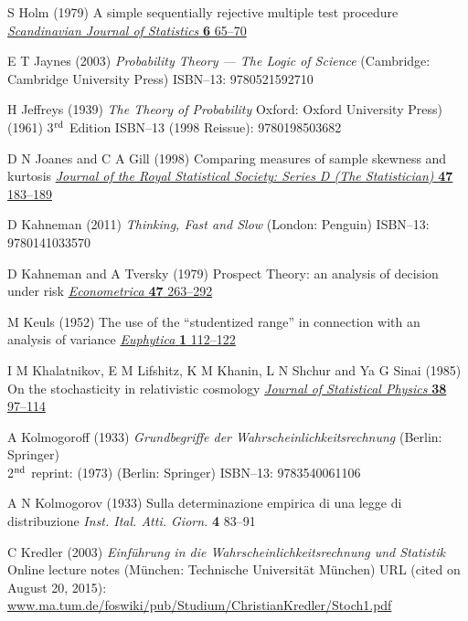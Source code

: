 \begin{thebibliography}{99}
S Holm
(1979) A simple sequentially rejective multiple test procedure
\href{http://www.jstor.org/stable/4615733}{\textit{Scandinavian 
Journal of Statistics} \textbf{6} 65--70}

E T Jaynes
(2003) \textit{Probability Theory --- The Logic of Science}
(Cambridge: Cambridge University Press) 
ISBN--13: 9780521592710

H Jeffreys
(1939) \textit{The Theory of Probability} 
Oxford: Oxford University Press)\\
(1961) 3$^{\rm rd}$ Edition
ISBN--13 (1998 Reissue): 9780198503682

D N Joanes and C A Gill
(1998) Comparing measures of sample skewness and kurtosis 
\href{http://dx.doi.org/10.1111/1467-9884.00122}{\textit{Journal of 
the Royal Statistical Society: Series D (The Statistician)} \textbf{
47} 183--189}

D Kahneman
(2011) \textit{Thinking, Fast and Slow} (London: Penguin)
ISBN--13: 9780141033570

D Kahneman and A Tversky
(1979) Prospect Theory: an analysis of decision under risk
\href{http://www.jstor.org/stable/1914185}{\textit{Econometrica} 
\textbf{47} 263--292}

M Keuls
(1952) The use of the ``studentized range'' in connection with an 
analysis of variance
\href{http://dx.doi.org/10.1007/BF01908269}{\textit{Euphytica}
\textbf{1} 112--122}

I M Khalatnikov, E M Lifshitz, K M Khanin, L N Shchur and Ya G 
Sinai (1985) On the stochasticity in relativistic cosmology
\href{http://dx.doi.org/10.1007/BF01017851}{\textit{Journal of 
Statistical Physics} \textbf{38} 97--114}

A Kolmogoroff
(1933) \textit{Grundbegriffe der Wahrscheinlichkeitsrechnung}
(Berlin: Springer)\\
2$^{\rm nd}$ reprint: (1973) (Berlin: Springer) ISBN--13: 
9783540061106

A N Kolmogorov
(1933) Sulla determinazione empirica di una legge di distribuzione
\textit{Inst. Ital. Atti. Giorn.} \textbf{4} 83--91

C Kredler
(2003) \textit{Einf\"{u}hrung in die 
Wahrscheinlichkeitsrechnung und Statistik} Online lecture notes 
(M\"{u}nchen: Technische Universit\"{a}t M\"{u}nchen)
URL (cited on August 20, 2015): 
\href{http://www.ma.tum.de/foswiki/pub/Studium/ChristianKredler/Stoch1.pdf}{www.ma.tum.de/foswiki/pub/Studium/ChristianKredler/Stoch1.pdf}


\end{thebibliography}
